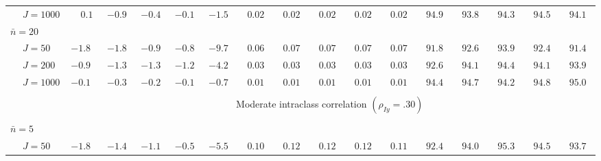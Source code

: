 \begin{sidewaystable}
\begin{threeparttable}
\begin{tabular}{llccccccccccccccc}
 & \nopagebreak $\;J=1000$  & $\phantom{-}0.1\phantom{0}$ & ${-}0.9\phantom{0}$ & ${-}0.4\phantom{0}$ & ${-}0.1\phantom{0}$ & ${-}1.5\phantom{0}$ & $\phantom{0}0.02\phantom{0}$ & $\phantom{0}0.02\phantom{0}$ & $\phantom{0}0.02\phantom{0}$ & $\phantom{0}0.02\phantom{0}$ & $\phantom{0}0.02\phantom{0}$ & $\phantom{0}94.9\phantom{0}$ & $\phantom{0}93.8\phantom{0}$ & $\phantom{0}94.3\phantom{0}$ & $\phantom{0}94.5\phantom{0}$ & $\phantom{0}94.1\phantom{0}$ \\
\multicolumn{4}{l}{$\bar{n}=20$} \\  & \nopagebreak $\;J=50$  & ${-}1.8\phantom{0}$ & ${-}1.8\phantom{0}$ & ${-}0.9\phantom{0}$ & ${-}0.8\phantom{0}$ & ${-}9.7\phantom{0}$ & $\phantom{0}0.06\phantom{0}$ & $\phantom{0}0.07\phantom{0}$ & $\phantom{0}0.07\phantom{0}$ & $\phantom{0}0.07\phantom{0}$ & $\phantom{0}0.07\phantom{0}$ & $\phantom{0}91.8\phantom{0}$ & $\phantom{0}92.6\phantom{0}$ & $\phantom{0}93.9\phantom{0}$ & $\phantom{0}92.4\phantom{0}$ & $\phantom{0}91.4\phantom{0}$ \\
 & \nopagebreak $\;J=200$  & ${-}0.9\phantom{0}$ & ${-}1.3\phantom{0}$ & ${-}1.3\phantom{0}$ & ${-}1.2\phantom{0}$ & ${-}4.2\phantom{0}$ & $\phantom{0}0.03\phantom{0}$ & $\phantom{0}0.03\phantom{0}$ & $\phantom{0}0.03\phantom{0}$ & $\phantom{0}0.03\phantom{0}$ & $\phantom{0}0.03\phantom{0}$ & $\phantom{0}92.6\phantom{0}$ & $\phantom{0}94.1\phantom{0}$ & $\phantom{0}94.4\phantom{0}$ & $\phantom{0}94.1\phantom{0}$ & $\phantom{0}93.9\phantom{0}$ \\
 & \nopagebreak $\;J=1000$  & ${-}0.1\phantom{0}$ & ${-}0.3\phantom{0}$ & ${-}0.2\phantom{0}$ & ${-}0.1\phantom{0}$ & ${-}0.7\phantom{0}$ & $\phantom{0}0.01\phantom{0}$ & $\phantom{0}0.01\phantom{0}$ & $\phantom{0}0.01\phantom{0}$ & $\phantom{0}0.01\phantom{0}$ & $\phantom{0}0.01\phantom{0}$ & $\phantom{0}94.4\phantom{0}$ & $\phantom{0}94.7\phantom{0}$ & $\phantom{0}94.2\phantom{0}$ & $\phantom{0}94.8\phantom{0}$ & $\phantom{0}95.0\phantom{0}$ \\
[0.5ex]\hline\\[-1.6ex] 
& & \multicolumn{15}{c}{Moderate intraclass correlation $(\rho_{Iy}=.30)$} \\[0.6ex]\hline\\[-1.8ex]
\multicolumn{4}{l}{$\bar{n}=5$} \\  & \nopagebreak $\;J=50$  & ${-}1.8\phantom{0}$ & ${-}1.4\phantom{0}$ & ${-}1.1\phantom{0}$ & ${-}0.5\phantom{0}$ & ${-}5.5\phantom{0}$ & $\phantom{0}0.10\phantom{0}$ & $\phantom{0}0.12\phantom{0}$ & $\phantom{0}0.12\phantom{0}$ & $\phantom{0}0.12\phantom{0}$ & $\phantom{0}0.11\phantom{0}$ & $\phantom{0}92.4\phantom{0}$ & $\phantom{0}94.0\phantom{0}$ & $\phantom{0}95.3\phantom{0}$ & $\phantom{0}94.5\phantom{0}$ & $\phantom{0}93.7\phantom{0}$ \\

\end{tabular}
\end{threeparttable}
\end{sidewaystable}
